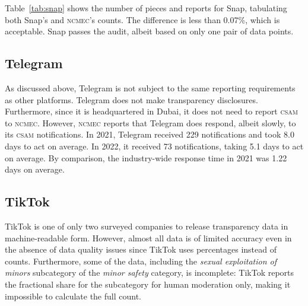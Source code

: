 \documentclass[nonacm,screen]{acmart}
\newcommand\V[1]{\textsc{\MakeLowercase{#1}}}
\begin{document}
\noindent{}Table~\ref{tab:snap} shows the number of pieces and reports for Snap,
tabulating both Snap's and \V{NCMEC}'s counts. The difference is less than
0.07\%, which is acceptable. Snap passes the audit, albeit based on only one
pair of data points.


\subsection{Telegram}

As discussed above, Telegram is not subject to the same reporting requirements
as other platforms. Telegram does not make transparency disclosures.
Furthermore, since it is headquartered in Dubai, it does not need to report
\V{CSAM} to \V{NCMEC}. However, \V{NCMEC} reports that Telegram does respond,
albeit slowly, to its \V{CSAM} notifications. In 2021, Telegram received 229
notifications and took 8.0 days to act on average. In 2022, it received 73
notifications, taking 5.1 days to act on average. By comparison, the
industry-wide response time in 2021 was 1.22 days on average.


\subsection{TikTok}

TikTok is one of only two surveyed companies to release transparency data in
machine-readable form. However, almost all data is of limited accuracy even in
the absence of data quality issues since TikTok uses percentages instead of
counts. Furthermore, some of the data, including the \emph{sexual exploitation
of minors} subcategory of the \emph{minor safety} category, is incomplete:
TikTok reports the fractional share for the subcategory for human moderation
only, making it impossible to calculate the full count.
\end{document}
